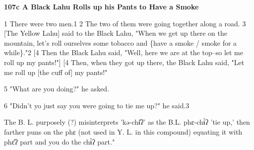 
\textbf{107c A Black Lahu Rolls up his Pants to Have a Smoke }

1 There were two men.1 2 The two of them were going together along a road. 3 [The
Yellow Lahu] said to the Black Lahu, "When we get up there on the mountain,
let's roll ourselves some tobacco and \{have a smoke / smoke for a while\}."2
[4 Then the Black Lahu said, "Well, here we are at the top--so let me
roll up my pants!"] [4 Then, when they got up there, the Black Lahu said,
"Let me roll up [the cuff of] my pants!"

5 "What are you doing?" he asked.

6 "Didn't yo just say you were going to tie me up?" he said.3

The B. L. purposely (?) misinterprets 'kə-chɨ̂ʔ' as the B.L. phɛ-chɨ̀ʔ
'tie up,' then farther puns on the phɛ (not used in Y. L. in this compound) equating
it with phɛ̂ʔ part and you do the chɨ̀ʔ part."

